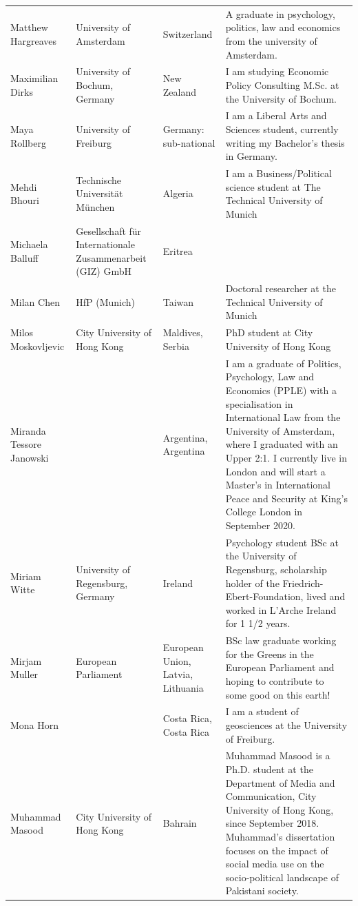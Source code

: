 \documentclass[
]{article}
\begin{document}
\begin{longtable}[t]{l>{\raggedright\arraybackslash}p{2cm}>{\raggedright\arraybackslash}p{2cm}>{\raggedright\arraybackslash}p{3cm}}
\rowcolor{gray!6}  Matthew Hargreaves & University of Amsterdam & Switzerland & A graduate in psychology, politics, law and economics from the university of Amsterdam.\\
Maximilian Dirks & University of Bochum, Germany & New Zealand & I am studying Economic Policy Consulting M.Sc. at the University of Bochum.\\
\rowcolor{gray!6}  Maya Rollberg & University of Freiburg & Germany: sub-national & I am a Liberal Arts and Sciences student, currently writing my Bachelor's thesis in Germany.\\
Mehdi Bhouri & Technische Universität München & Algeria & I am a Business/Political science student at The Technical University of Munich\\
\addlinespace
\rowcolor{gray!6}  Michaela Balluff & Gesellschaft für Internationale Zusammenarbeit (GIZ) GmbH & Eritrea & \\
Milan Chen & HfP (Munich) & Taiwan & Doctoral researcher at the Technical University of Munich\\
\rowcolor{gray!6}  Milos Moskovljevic & City University of Hong Kong & Maldives, Serbia & PhD student at City University of Hong Kong\\
Miranda Tessore Janowski &  & Argentina, Argentina & I am a graduate of Politics, Psychology, Law and Economics (PPLE) with a specialisation in International Law from the University of Amsterdam, where I graduated with an Upper 2:1. I currently live in London and will start a Master's in International Peace and Security at King's College London in September 2020.\\
\rowcolor{gray!6}  Miriam Witte & University of Regensburg, Germany & Ireland & Psychology student BSc at the University of Regensburg, scholarship holder of the Friedrich-Ebert-Foundation, lived and worked in L'Arche Ireland for 1 1/2 years.\\
\addlinespace
Mirjam Muller & European Parliament & European Union, Latvia, Lithuania & BSc law graduate working for the Greens in the European Parliament and hoping to contribute to some good on this earth!\\
\rowcolor{gray!6}  Mona Horn &  & Costa Rica, Costa Rica & I am a student of geosciences at the University of Freiburg.\\
Muhammad Masood & City University of Hong Kong & Bahrain & Muhammad Masood is a Ph.D. student at the Department of Media and Communication, City University of Hong Kong, since September 2018. Muhammad's dissertation focuses on the impact of social media use on the socio-political landscape of Pakistani society.\\

\end{longtable}
\end{document}
